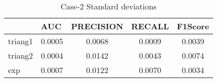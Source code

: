 \begin{table}[htbp]
  \centering
  \caption{Case-2 Standard deviations}
    \begin{tabular}{|p{2.89em}|c|c|c|c|}
    \toprule
    \rowcolor[rgb]{ .718,  .871,  .91} \multicolumn{1}{|l|}{Policy} & \multicolumn{1}{l|}{AUC} & \multicolumn{1}{l|}{PRECISION} & \multicolumn{1}{l|}{RECALL} & \multicolumn{1}{l|}{F1Score} \\
    \midrule
    \rowcolor[rgb]{ .847,  .894,  .737} triang1 & 0.0005 & 0.0068 & 0.0009 & 0.0039 \\
    \midrule
    \rowcolor[rgb]{ .847,  .894,  .737} triang2 & 0.0004 & 0.0142 & 0.0043 & 0.0074 \\
    \midrule
    \rowcolor[rgb]{ .847,  .894,  .737} exp   & 0.0007 & 0.0122 & 0.0070 & 0.0034 \\
    \bottomrule
    \end{tabular}%
  \label{tab:sk36std}%
\end{table}%
